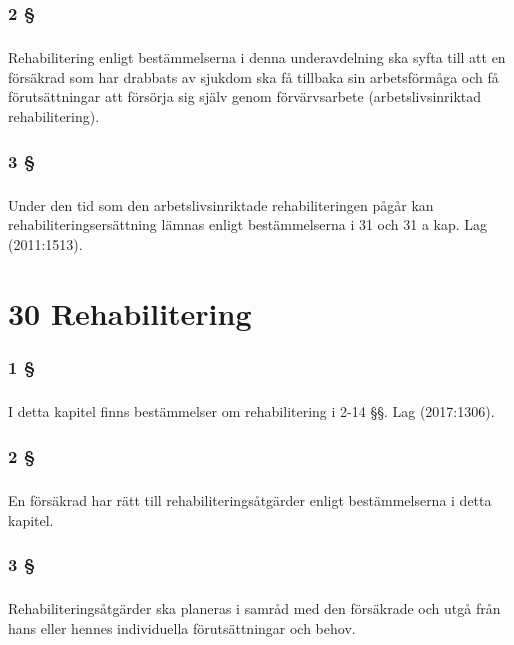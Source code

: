 \documentclass[a4paper,notitlepage,openany,10pt]{book}
\begin{document}
\subsection*{2 §}
\paragraph*{}
Rehabilitering enligt bestämmelserna i denna underavdelning ska syfta till att en försäkrad som har drabbats av sjukdom ska få tillbaka sin arbetsförmåga och få förutsättningar att försörja sig själv genom förvärvsarbete (arbetslivsinriktad rehabilitering).
\subsection*{3 §}
\paragraph*{}
Under den tid som den arbetslivsinriktade rehabiliteringen pågår kan rehabiliteringsersättning lämnas enligt bestämmelserna i 31 och 31 a kap.
Lag (2011:1513).
\chapter*{30 Rehabilitering}
\subsection*{1 §}
\paragraph*{}
I detta kapitel finns bestämmelser om rehabilitering i 2-14 §§.
Lag (2017:1306).
\subsection*{2 §}
\paragraph*{}
En försäkrad har rätt till rehabiliteringsåtgärder enligt bestämmelserna i detta kapitel.
\subsection*{3 §}
\paragraph*{}
Rehabiliteringsåtgärder ska planeras i samråd med den försäkrade och utgå från hans eller hennes individuella förutsättningar och behov.
\end{document}
